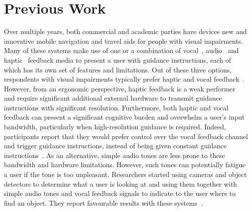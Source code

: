 \documentclass[acmsmall]{acmart}
\begin{document}
\section{Previous Work}\label{sec:prev-work}

Over multiple years, both commercial and academic parties have devices new and innovative mobile navigation and travel aids for people with visual impairments.
Many of these systems make use of one or a combination of vocal~\citep{mocanu2016when,chessa2016integrated,kanwal2015navigation}, audio~\citep{schwarze2015intuitive,rodriguez2012obstacle,katz2010navig} and haptic~\citep{rivera-rubio2015assistive,lee2015rgb,xiao2015assistive} feedback media to present a user with guidance instructions, each of which has its own set of features and limitations.
Out of these three options, respondents with visual impairments typically prefer haptic and vocal feedback~\citep{arditi2013user}.
However, from an ergonomic perspective, haptic feedback is a weak performer and require significant additional external hardware to transmit guidance instructions with significant resolution.
Furthermore, both haptic and vocal feedback can present a significant cognitive burden and overwhelm a user's input bandwidth, particularly when high-resolution guidance is required.
Indeed, participants report that they would prefer control over the vocal feedback channel and trigger guidance instructions, instead of being given constant guidance instructions~\citep{arditi2013user}.
As an alternative, simple audio tones are less prone to these bandwidth and hardware limitations.
However, such tones can potentially fatigue a user if the tone is too unpleasant.
Researchers started using cameras and object detectors to determine what a user is looking at and using them together with simple audio tones and vocal feedback signals to indicate to the user where to find an object.
They report favourable results with these systems~\citep{schauerte2012assistive,tian2013computer,fiannaca2014headlock,vazquez2012helping}.
\end{document}
